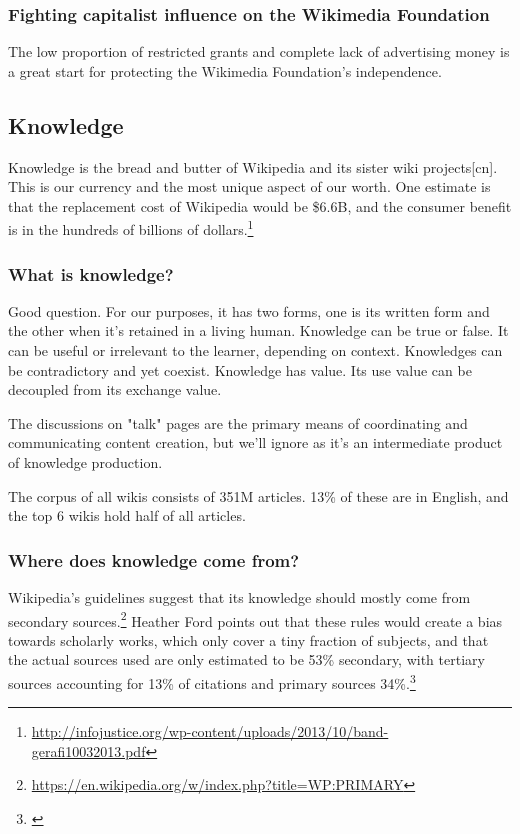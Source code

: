 \documentclass[format=sigconf, authorversion]{acmart}
\begin{document}
\subsubsection{Fighting capitalist influence on the Wikimedia Foundation}

The low proportion of restricted grants and complete lack of advertising money is a great start for protecting the Wikimedia Foundation's independence.

\subsection{Knowledge}

Knowledge is the bread and butter of Wikipedia and its sister wiki projects[cn]. This is our currency and the most unique aspect of our worth.  One estimate is that the replacement cost of Wikipedia would be \$6.6B, and the consumer benefit is in the hundreds of billions of dollars.\footnote{\url{http://infojustice.org/wp-content/uploads/2013/10/band-gerafi10032013.pdf}}

\subsubsection{What is knowledge?}

Good question.  For our purposes, it has two forms, one is its written form and the other when it's retained in a living human.  Knowledge can be true or false.  It can be useful or irrelevant to the learner, depending on context.  Knowledges can be contradictory and yet coexist.  Knowledge has value.  Its use value can be decoupled from its exchange value.

The discussions on "talk" pages are the primary means of coordinating and communicating content creation, but we'll ignore as it's an intermediate product of knowledge production.

The corpus of all wikis consists of 351M articles.  13\% of these are in English, and the top 6 wikis hold half of all articles.

\subsubsection{Where does knowledge come from?}

Wikipedia's guidelines suggest that its knowledge should mostly come from secondary sources.\footnote{\url{https://en.wikipedia.org/w/index.php?title=WP:PRIMARY}}  Heather Ford points out that these rules would create a bias towards scholarly works, which only cover a tiny fraction of subjects, and that the actual sources used are only estimated to be 53\% secondary, with tertiary sources accounting for 13\% of citations and primary sources 34\%.\footnote{\citet{Ford2013}}
\end{document}
